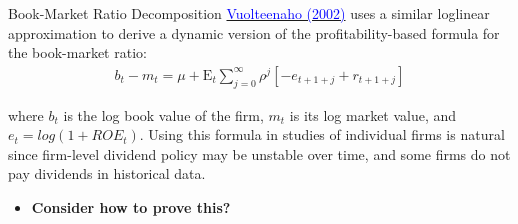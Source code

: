 \documentclass{beamer}
\begin{document}
\begin{frame}{Book-Market Ratio Decomposition}
 \href{https://doi.org/10.1111/1540-6261.00437}{\textcolor{blue}{Vuolteenaho (2002)}} uses a similar loglinear approximation to derive a dynamic version of the profitability-based formula for the book-market ratio:
	\begin{align*}
		b_{t}-m_{t}=\mu+\mathrm{E}_{t} \sum_{j=0}^{\infty} \rho^{j}\left[-e_{t+1+j}+r_{t+1+j}\right]
	\end{align*}

where $ b_t $ is the log book value of the firm, $ m_t $ is its log market value, and $ e_t  = log(1 + ROE_t)$. Using this formula in studies of individual firms is natural since firm-level dividend policy may be unstable over time, and some firms do not pay dividends in historical data.\\

\begin{itemize}
	\item \textbf{Consider how to prove this?}
\end{itemize}

\end{frame}
\end{document}
